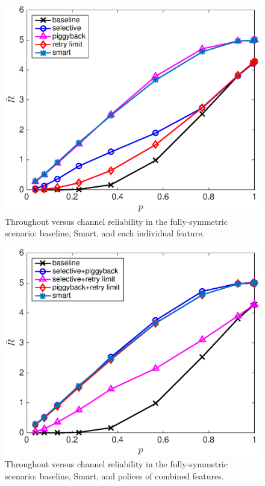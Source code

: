 \documentclass{article}
\begin{document}
\begin{figure}[htbp]
\centering
\includegraphics[scale=0.5]{3policycompare_sym.eps}
\caption{Throughout versus channel reliability in the fully-symmetric scenario: baseline, Smart, and each individual feature.}
\label{sim: sym: three features}
\end{figure}
\begin{figure}[htbp]
\centering
\includegraphics[scale=0.5]{sym_threecombinepolicys.eps}
\caption{Throughout versus channel reliability in the fully-symmetric scenario: baseline, Smart, and polices of combined features.}
\label{sim: sym: combined}
\end{figure}
\end{document}
